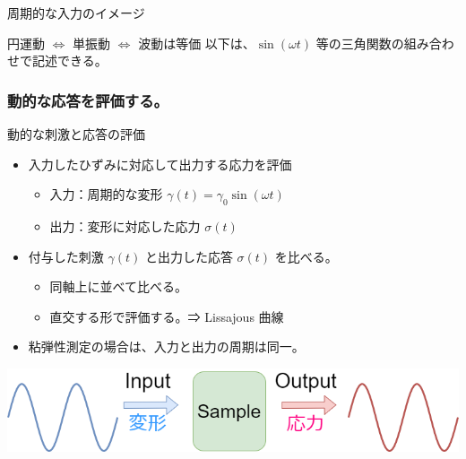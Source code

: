 \documentclass[12pt, dvipdfmx]{beamer}
\begin{document}
\begin{frame}{周期的な入力のイメージ}
	\begin{exampleblock}{円運動 $\Leftrightarrow$ 単振動 $\Leftrightarrow$ 波動は等価}
		以下は、$\sin(\omega t)$ 等の三角関数の組み合わせで記述できる。

		\vspace{3mm}
		\centering
	\end{exampleblock}
\end{frame}

\begin{frame}
	\frametitle{動的な応答を評価する。}
		\begin{block}{動的な刺激と応答の評価}
			\begin{itemize}
				\item 入力したひずみに対応して出力する応力を評価
				\begin{itemize}
					\item 入力：周期的な変形 $\gamma(t) = \gamma_0 \sin(\omega t)$
					\item 出力：変形に対応した応力 $\sigma(t)$
				\end{itemize}
				\item 付与した刺激 $\gamma (t)$ と出力した応答 $\sigma (t)$ を比べる。
				\begin{itemize}
					\item 同軸上に並べて比べる。
					\item 直交する形で評価する。⇒ Lissajous 曲線
				\end{itemize}
				\item 粘弾性測定の場合は、入力と出力の周期は同一。
			\end{itemize}
		\end{block}
		\vspace{3mm}
		\centering
			\includegraphics[width=\textwidth]{dynamic_IO.png}
\end{frame}
\end{document}

